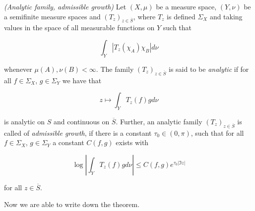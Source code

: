\begin{mdframed}
	\begin{definition}\emph{(Analytic family, admissible growth)}
		Let $(X,\mu)$ be a measure space, $(Y,\nu)$ be a semifinite measure spaces and $\left( T_z \right)_{z \in \overline{S}}$, where $T_z$ is defined $\Sigma_X$ and taking values in the space of all measurable functions on $Y$ such that

		\begin{equation}
			\int_Y \left| T_z(\chi_A)\chi_B \right| d\nu
		\end{equation}

		whenever $\mu(A),\nu(B) < \infty$. The family $\left( T_z \right)_{z \in \overline{S}}$ is said to be \emph{analytic} if for all $f \in \Sigma_X$, $g \in \Sigma_Y$ we have that

		\begin{equation}
			z \mapsto \int_Y T_z(f)gd\nu
		\end{equation}

		is analytic on $S$ and continuous on $\overline{S}$. Further, an analytic family $\left( T_z \right)_{z \in \overline{S}}$ is called of \emph{admissible growth}, if there is a constant $\tau_0 \in (0,\pi)$, such that for all $f \in \Sigma_X$, $g \in \Sigma_Y$ a constant $C(f,g)$ exists with

			\begin{equation}
				\log\left| \int_Y T_z(f) g d\nu\right| \leq C(f,g)e^{\tau_0\left| \Im z\right|}
			\end{equation}

			for all $z \in \overline{S}$.
	\end{definition}
\end{mdframed}

\vspace{2mm}

Now we are able to write down the theorem.

\vspace{2mm}

